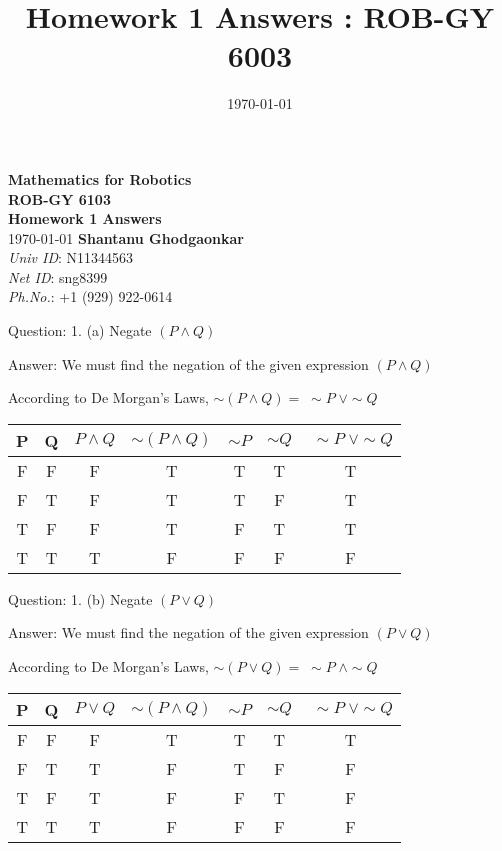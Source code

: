 \documentclass[a4paper]{article}
\title{Homework 1 Answers : ROB-GY 6003}
\author{\myName}
\date{\today}
\newcommand{\myName}{\textbf{Shantanu Ghodgaonkar}\\\textit{Univ ID}: N11344563\\\textit{Net ID}: sng8399\\\textit{Ph.No.}: +1 (929) 922-0614}
\begin{document}
	
	\begin{titlepage}
	    \centering
	    \vspace{2cm}
	    \Huge\textbf{Mathematics for Robotics \\ ROB-GY 6103 \\ Homework 1 Answers}
	    \vspace{1cm}
	    \\ \Large \today
	    \vfill
	    \Large \myName
	\end{titlepage}
	
	\begin{qalist}			
		\item[Question: 1. (a)] \setcounter{equation}{0} Negate $(P \land Q)$ 
		\item[Answer:] We must find the negation of the given expression $(P \land Q)$ 
			\begin{center}
				According to De Morgan's Laws, $\sim (P \land Q) = \; \sim P \; \lor \sim Q$
				
				
				\begin{tabular}{|c|c|c|c|c|c|c|}
					\hline
					P & Q & \(P \land Q\) & \(\sim (P \land Q)\) & \(\sim P\) & \(\sim Q\) & \( \; \sim P \; \lor \sim Q \) \\
					\hline
					F & F & F & T & T & T & T \\
					F & T & F & T & T & F & T \\
					T & F & F & T & F & T & T \\
					T & T & T & F & F & F & F \\
					\hline
				\end{tabular}
			\end{center}
			
			
		\item[Question: 1. (b)] \setcounter{equation}{0} Negate $(P \lor Q)$ 
		\item[Answer:] We must find the negation of the given expression $(P \lor Q)$ 
			\begin{center}
				According to De Morgan's Laws, $\sim (P \lor Q) = \; \sim P \; \land \sim Q$
				
				
				\begin{tabular}{|c|c|c|c|c|c|c|}
					\hline
					P & Q & \(P \lor Q\) & \(\sim (P \land Q)\) & \(\sim P\) & \(\sim Q\) & \( \; \sim P \; \lor \sim Q \) \\
					\hline
					F & F & F & T & T & T & T \\
					F & T & T & F & T & F & F \\
					T & F & T & F & F & T & F \\
					T & T & T & F & F & F & F \\
					\hline
				\end{tabular}
			\end{center}
		

\end{qalist}
\end{document}
